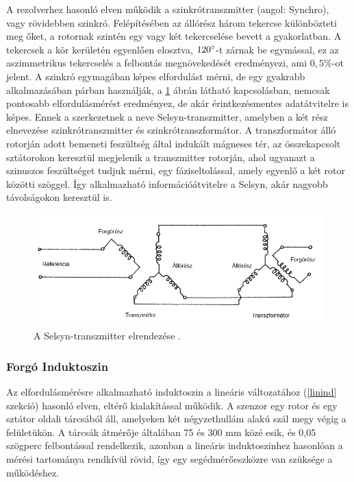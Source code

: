 A rezolverhez hasonló elven működik a szinkrótranszmitter (angol: Synchro), vagy rövidebben szinkró. Felépítésében az állórész három tekercse különbözteti meg őket, a rotornak szintén egy vagy két tekercselése bevett a gyakorlatban. A tekercsek a kör kerületén egyenlően elosztva, $120\degree$-t zárnak be egymással, ez az aszimmetrikus tekercselés a felbontás megnövekedését eredményezi, ami $0,5\%$-ot jelent. A szinkró egymagában képes elfordulást mérni, de egy gyakrabb alkalmazásában párban használják, a \ref{selsyn} ábrán látható kapcsolásban, nemcsak pontosabb elfordulásmérést eredményez, de akár érintkezésmentes adatátvitelre is képes. Ennek a szerkezetnek a neve Selsyn-transzmitter, amelyben a két rész elnevezése szinkrótranszmitter és szinkrótranszformátor. A transzformátor álló rotorján adott bemeneti feszültség által indukált mágneses tér, az összekapcsolt sztátorokon keresztül megjelenik a transzmitter rotorján, ahol ugyanazt a szinuszos feszültséget tudjuk mérni, egy fáziseltolással, amely egyenlő a két rotor közötti szöggel. Így alkalmazható információátvitelre a Selsyn, akár nagyobb távolságokon keresztül is.
\begin{figure}
	\centering
	\includegraphics[width=\columnwidth*8/10]{figures/selsyn.png}
	\caption{A Selsyn-transzmitter elrendezése \cite{Morris2016b}.}
	\label{selsyn}
\end{figure}

\subsubsection{Forgó Induktoszin}

Az elfordulásmérésre alkalmazható induktoszin a lineáris változatához (\ref{linind} szekció) hasonló elven, eltérő kialakítással működik. A szenzor egy rotor és egy sztátor oldali tárcsából áll, amelyeken két négyzethullám alakú szál megy végig a felületükön. A tárcsák átmérője általában 75 és 300 mm közé esik, és 0,05 szögperc felbontással rendelkezik, azonban a lineáris induktoszinhez hasonlóan a mérési tartománya rendkívül rövid, így egy segédmérőeszközre van szüksége a működéshez.

